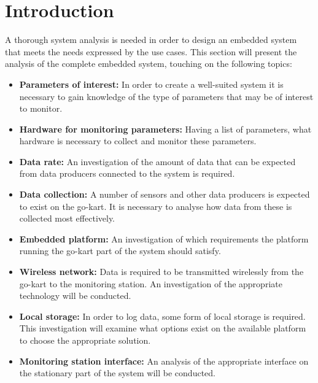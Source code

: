 \section{Introduction} %
\label{sec:system_analysis}
A thorough system analysis is needed in order to design an embedded system that meets the needs expressed by the use cases. 
This section will present the analysis of the complete embedded system, touching on the following topics:

\begin{itemize}
	\item  \textbf{Parameters of interest:} In order to create a well-suited system it is necessary to gain knowledge of the type of parameters that may be of interest to monitor.
	\item \textbf{Hardware for monitoring parameters:} Having a list of parameters, what hardware is necessary to collect and monitor these parameters.
	\item \textbf{Data rate:} An investigation of the amount of data that can be expected from data producers connected to the system is required.
	\item \textbf{Data collection:} A number of sensors and other data producers is expected to exist on the go-kart.
	It is necessary to analyse how data from these is collected most effectively.
	\item \textbf{Embedded platform:} An investigation of which requirements the platform running the go-kart part of the system should satisfy.
	\item \textbf{Wireless network:} Data is required to be transmitted wirelessly from the go-kart to the monitoring station.
	An investigation of the appropriate technology will be conducted.
	\item \textbf{Local storage:} In order to log data, some form of local storage is required.
	This investigation will examine what options exist on the available platform to choose the appropriate solution.
	\item \textbf{Monitoring station interface:} An analysis of the appropriate interface on the stationary part of the system will be conducted.
\end{itemize}















